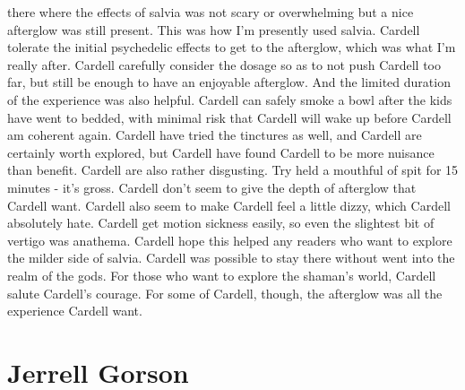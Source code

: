 \documentclass[12pt]{book}
\begin{document}
there where the effects of salvia was not scary or overwhelming but a nice afterglow was still present. This was how I'm presently used salvia. Cardell tolerate the initial psychedelic effects to get to the afterglow, which was what I'm really after. Cardell carefully consider the dosage so as to not push Cardell too far, but still be enough to have an enjoyable afterglow. And the limited duration of the experience was also helpful. Cardell can safely smoke a bowl after the kids have went to bedded, with minimal risk that Cardell will wake up before Cardell am coherent again. Cardell have tried the tinctures as well, and Cardell are certainly worth explored, but Cardell have found Cardell to be more nuisance than benefit. Cardell are also rather disgusting. Try held a mouthful of spit for 15 minutes - it's gross. Cardell don't seem to give the depth of afterglow that Cardell want. Cardell also seem to make Cardell feel a little dizzy, which Cardell absolutely hate. Cardell get motion sickness easily, so even the slightest bit of vertigo was anathema. Cardell hope this helped any readers who want to explore the milder side of salvia. Cardell was possible to stay there without went into the realm of the gods. For those who want to explore the shaman's world, Cardell salute Cardell's courage. For some of Cardell, though, the afterglow was all the experience Cardell want.



\chapter{Jerrell Gorson}
\end{document}
